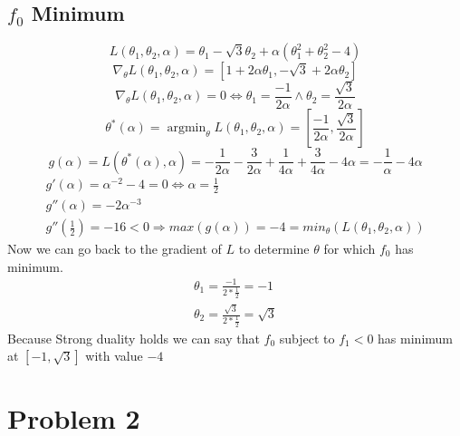 \documentclass{article}
\DeclareMathOperator*{\argmin}{argmin}
\begin{document}
\subsection{$f_0$ Minimum}
\begin{equation}
    L(\theta_1, \theta_2, \alpha) =\theta_1 - \sqrt{3}\theta_2 + \alpha(\theta_1^2 + \theta_2^2 -4)
\end{equation}
\begin{equation}
    \nabla_\theta L(\theta_1, \theta_2, \alpha) = [1 + 2 \alpha \theta_1, -\sqrt{3}+2\alpha\theta_2]
\end{equation}
\begin{equation}
    \nabla_\theta L(\theta_1, \theta_2, \alpha) = 0 \Leftrightarrow \theta_1 = \frac{-1}{2\alpha} \land \theta_2 = \frac{\sqrt{3}}{2\alpha} 
\end{equation}
\begin{equation}
    \theta^*(\alpha) = \argmin_\theta  L(\theta_1, \theta_2, \alpha) =
    [\frac{-1}{2\alpha}, \frac{\sqrt{3}}{2\alpha} ]
\end{equation}
\begin{equation}
    g(\alpha) = L(\theta^*(\alpha), \alpha) = -\frac{1}{2\alpha} - \frac{3}{2\alpha} 
    +\frac{1}{4\alpha} + \frac{3}{4\alpha} - 4\alpha = -\frac{1}{\alpha} - 4\alpha
\end{equation}
\begin{equation}
    \begin{gathered}
        g'(\alpha) = \alpha^{-2} - 4 = 0 \Leftrightarrow \alpha = \frac{1}{2}\\
        g''(\alpha) = -2\alpha^{-3} \\
        g''(\frac{1}{2}) =  -16 < 0 \Rightarrow max(g(\alpha)) = -4 = min_\theta(L(\theta_1, \theta_2, \alpha))  
    \end{gathered}
\end{equation}
Now we can go back to the gradient of $L$ to determine $\theta$ for which $f_0$ 
has minimum.
\begin{equation}
    \begin{gathered}
        \theta_1 = \frac{-1}{2 *\frac{1}{2}} = -1 \\
        \theta_2 = \frac{\sqrt{3}}{2*\frac{1}{2}} = \sqrt{3} 
    \end{gathered}
\end{equation}
Because Strong duality holds we can say that $f_0$ subject to $f_1 < 0$ has minimum
at $[-1, \sqrt{3}]$ with value $-4$
\section{Problem 2}
\end{document}
